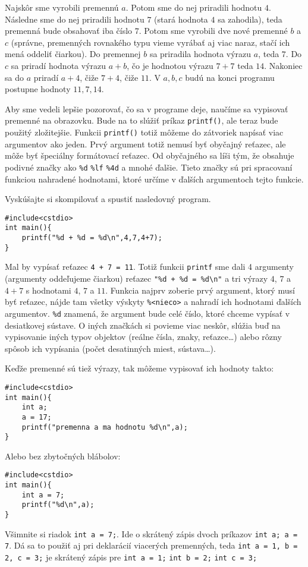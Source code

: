 \riesenie
Najskôr sme vyrobili premennú $a$. Potom sme do nej priradili hodnotu $4$.
Následne sme do nej priradili hodnotu $7$ (stará hodnota $4$ sa zahodila), teda
premenná bude obsahovať iba číslo $7$. Potom sme vyrobili dve nové premenné $b$
a $c$ (správne, premenných rovnakého typu vieme vyrábať aj viac naraz, stačí
ich mená oddeliť čiarkou).  Do premennej $b$ sa priradila hodnota výrazu $a$,
teda $7$. Do $c$ sa priradí hodnota výrazu $a + b$, čo je hodnotou výrazu $7 +
7$ teda $14$. Nakoniec sa do $a$ priradí $a + 4$, čiže $7+4$, čiže $11$. V
$a,b,c$ budú na konci programu postupne hodnoty $11,7,14$.

\medskip

Aby sme vedeli lepšie pozorovať, čo sa v programe deje, naučíme sa vypisovať
premenné na obrazovku. Bude na to slúžiť príkaz \verb!printf()!, ale teraz bude
použitý zložitejšie. Funkcii \verb!printf()! totiž môžeme do zátvoriek napísať
viac argumentov ako jeden. Prvý argument totiž nemusí byť obyčajný reťazec,
ale môže byť špeciálny formátovací reťazec. Od obyčajného sa líši tým, že
obsahuje podivné značky ako \verb!%d! \verb!%lf! \verb!%4d! a mnohé ďalšie.
Tieto značky sú pri spracovaní funkciou nahradené hodnotami, ktoré určíme v
ďalších argumentoch tejto funkcie.

Vyskúšajte si skompilovať a spustiť nasledovný program.
\begin{lstlisting}
#include<cstdio>
int main(){
    printf("%d + %d = %d\n",4,7,4+7);
}
\end{lstlisting}
Mal by vypísať reťazec \verb!4 + 7 = 11!. Totiž funkcii \verb!printf! sme dali
4 argumenty (argumenty oddeľujeme čiarkou) reťazec \verb!"%d + %d = %d\n"! a
tri výrazy $4$, $7$ a $4+7$ s hodnotami $4$, $7$ a $11$.  Funkcia najprv
zoberie prvý argument, ktorý musí byť reťazec, nájde tam všetky výskyty
\verb!%<nieco>! a nahradí ich hodnotami ďalších argumentov.  \verb!%d! znamená,
že argument bude celé číslo, ktoré chceme vypísať v desiatkovej sústave. O
iných značkách si povieme viac neskôr, slúžia buď na vypisovanie iných typov
objektov (reálne čísla, znaky, reťazce\dots) alebo rôzny spôsob ich vypísania
(počet desatinných miest, sústava\dots).

Keďže premenné sú tiež výrazy, tak môžeme vypisovať ich hodnoty takto:
\begin{lstlisting}
#include<cstdio>
int main(){
    int a;
    a = 17;
    printf("premenna a ma hodnotu %d\n",a);
}
\end{lstlisting}
Alebo bez zbytočných blábolov:
\begin{lstlisting}
#include<cstdio>
int main(){
    int a = 7;
    printf("%d\n",a);
}
\end{lstlisting}
Všimnite si riadok \verb!int a = 7;!. Ide o skrátený zápis dvoch príkazov
\verb!int a; a = 7!. Dá sa to použiť aj pri deklarácií viacerých premenných,
teda \verb!int a = 1, b = 2, c = 3;! je skrátený zápis pre \verb!int a = 1;!
\verb!int b = 2;! \verb!int c = 3;!

